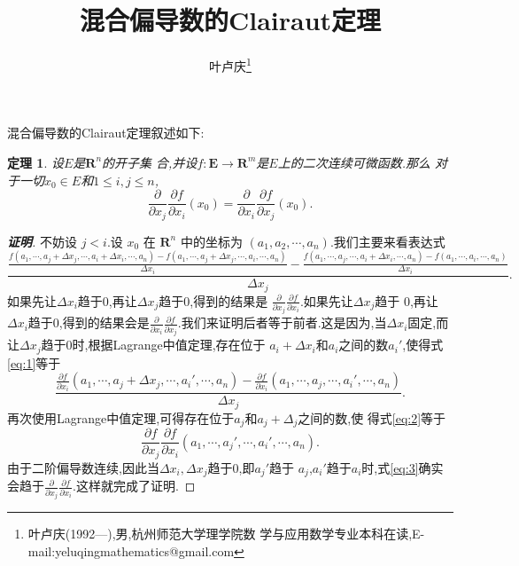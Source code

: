 \documentclass[a4paper]{article}
\newtheorem*{theo}{定理}
\newenvironment{theorem}
{\bigskip\begin{mdframed}\begin{theo}}
    {\end{theo}\end{mdframed}\bigskip}
\newcommand{\pa}{\partial} \newcommand{\Om}{\Omega}
\begin{document}
\title{\huge{\bf{混合偏导数的Clairaut定理}}}
\author{\small{叶卢庆\footnote{叶卢庆(1992---),男,杭州师范大学理学院数
      学与应用数学专业本科在读,E-mail:yeluqingmathematics@gmail.com}}}
\maketitle
混合偏导数的Clairaut定理叙述如下:
\begin{theorem}
  设$E$是$\mathbf{R}^n$的开子集
  合,并设$f:\mathbf{E}\to\mathbf{R}^{m}$是$E$上的二次连续可微函数.那么
  对于一切$x_0\in E$和$1\leq i,j\leq n$,
$$
\frac{\partial }{\partial x_j}\frac{\partial f}{\partial x_i}(x_0)=
\frac{\partial }{\partial x_i}\frac{\partial f}{\partial x_j}(x_0).
$$
\end{theorem}
\begin{proof}[\textbf{证明}]
不妨设 $j<i$.设 $x_0$ 在 $\mathbf{R}^n$ 中的坐标为
$(a_1,a_2,\cdots,a_n)$.我们主要来看表达式{\tiny
\begin{equation}\label{eq:1}
\frac{\frac{f(a_1,\cdots,a_j+\Delta x_j,\cdots,a_i+\Delta
          x_i,\cdots,a_n)-f(a_1,\cdots,a_j+\Delta
          x_j,\cdots,a_i,\cdots,a_n)}{\Delta
          x_i}-\frac{f(a_1,\cdots,a_j,\cdots,a_i+\Delta
          x_i,\cdots,a_n)-f(a_1,\cdots,a_i,\cdots,a_n)}{\Delta
          x_i}}{\Delta x_j}.
\end{equation}}
如果先让$\Delta x_i$趋于$0$,再让$\Delta x_j$趋于$0$,得到的结果是
$\frac{\pa}{\pa x_j}\frac{\pa f}{\pa x_i}$.如果先让$\Delta x_j$趋于
$0$,再让$\Delta x_i$趋于$0$,得到的结果会是$\frac{\pa}{\pa
  x_i}\frac{\pa f}{\pa x_j}$.我们来证明后者等于前者.这是因为,当$\Delta
x_i$固定,而让$\Delta x_j$趋于$0$时,根据Lagrange中值定理,存在位于
$a_i+\Delta x_i$和$a_i$之间的数$a_i'$,使得式\eqref{eq:1}等于
\begin{equation}
  \label{eq:2}
  \frac{\frac{\pa f}{\pa x_i}(a_1,\cdots,a_j+\Delta
    x_j,\cdots,a_i',\cdots,a_n)-\frac{\pa f}{\pa
      x_i}(a_1,\cdots,a_j,\cdots,a_i',\cdots,a_n)}{\Delta x_j}.
\end{equation}
再次使用Lagrange中值定理,可得存在位于$a_{j}$和$a_{j}+\Delta_j$之间的数,使
得式\eqref{eq:2}等于
\begin{equation}
  \label{eq:3}
  \frac{\pa f}{\pa x_j}\frac{\pa f}{\pa x_i}(a_1,\cdots,a_j',\cdots,a_i',\cdots,a_n).
\end{equation}
由于二阶偏导数连续,因此当$\Delta x_i,\Delta x_{j}$趋于$0$,即$a_j'$趋于
$a_j$,$a_i'$趋于$a_i$时,式\eqref{eq:3}确实会趋于$\frac{\pa }{\pa
  x_j}\frac{\pa f}{\pa x_i}$.这样就完成了证明.
\end{proof}
\end{document}
